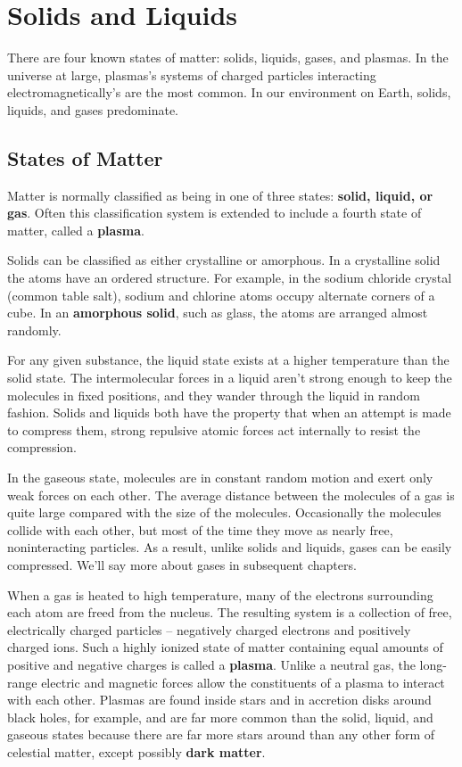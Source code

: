 \section{Solids and Liquids}
There are four known states of matter: solids, liquids, gases, and plasmas. In the universe at large, plasmas's systems of charged particles interacting electromagnetically's are the most common. In our environment on Earth, solids, liquids, and gases predominate.

\subsection{States of Matter}
Matter is normally classified as being in one of three states: \textbf{solid, liquid, or gas}. Often this classification system is extended to include a fourth state of matter, called a \textbf{plasma}.

Solids can be classified as either crystalline or amorphous. In a crystalline solid the atoms have an ordered structure. For example, in the sodium chloride crystal (common table salt), sodium and chlorine atoms occupy alternate corners of a cube. In an \textbf{amorphous solid}, such as glass, the atoms are arranged almost randomly.

For any given substance, the liquid state exists at a higher temperature than the solid state. The intermolecular forces in a liquid aren't strong enough to keep the molecules in fixed positions, and they wander through the liquid in random fashion. Solids and liquids both have the property that when an attempt is made to compress them, strong repulsive atomic forces act internally to resist the
compression.

In the gaseous state, molecules are in constant random motion and exert only weak forces on each other. The average distance between the molecules of a gas is quite large compared with the size of the molecules. Occasionally the molecules collide with each other, but most of the time they move as nearly free, noninteracting particles. As a result, unlike solids and liquids, gases can be easily compressed. We'll say more about gases in subsequent chapters.

When a gas is heated to high temperature, many of the electrons surrounding each atom are freed from the nucleus. The resulting system is a collection of free, electrically charged particles -- negatively charged electrons and positively charged ions. Such a highly ionized state of matter containing equal amounts of positive and negative charges is called a \textbf{plasma}. Unlike a neutral gas, the long-range electric and magnetic forces allow the constituents of a plasma to interact with each other. Plasmas are found inside stars and in accretion disks around black holes, for  example, and are far more common than the solid, liquid, and gaseous states because there are far more stars around than any other form of celestial matter, except possibly \textbf{dark matter}.

